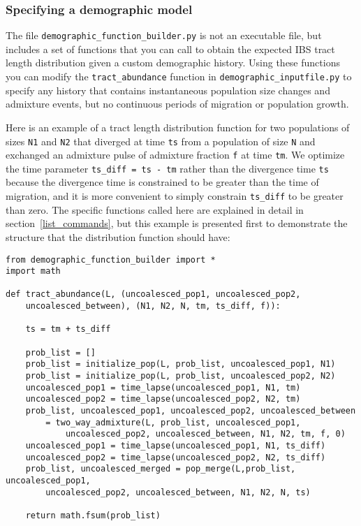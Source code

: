 \documentclass[12pt]{article}
\begin{document}
\subsubsection{Specifying a demographic model}\label{custom_model}

The file \verb|demographic_function_builder.py| is not an executable file, but includes a set of functions that you can call to obtain the expected IBS tract length distribution given a custom demographic history. Using these functions you can modify the \verb|tract_abundance| function in \verb|demographic_inputfile.py| to specify any history that contains instantaneous population size changes and admixture events, but no continuous periods of migration or population growth. 

Here is an example of a tract length distribution function for two populations of sizes \verb|N1| and \verb|N2| that diverged at time \verb|ts| from a population of size \verb|N| and exchanged an admixture pulse of admixture fraction \verb|f| at time \verb|tm|. We optimize the time parameter \verb|ts_diff = ts - tm| rather than the divergence time \verb|ts| because the divergence time is constrained to be greater than the time of migration, and it is more convenient to simply constrain \verb|ts_diff| to be greater than zero. The specific functions called here are explained in detail in section~\ref{list_commands}, but this example is presented first to demonstrate the structure that the distribution function should have:

\begin{Verbatim}
from demographic_function_builder import *
import math

def tract_abundance(L, (uncoalesced_pop1, uncoalesced_pop2, 
	uncoalesced_between), (N1, N2, N, tm, ts_diff, f)):
	
	ts = tm + ts_diff
	
	prob_list = []
	prob_list = initialize_pop(L, prob_list, uncoalesced_pop1, N1)
	prob_list = initialize_pop(L, prob_list, uncoalesced_pop2, N2)
	uncoalesced_pop1 = time_lapse(uncoalesced_pop1, N1, tm)
	uncoalesced_pop2 = time_lapse(uncoalesced_pop2, N2, tm)
	prob_list, uncoalesced_pop1, uncoalesced_pop2, uncoalesced_between 
		= two_way_admixture(L, prob_list, uncoalesced_pop1, 
			uncoalesced_pop2, uncoalesced_between, N1, N2, tm, f, 0)
	uncoalesced_pop1 = time_lapse(uncoalesced_pop1, N1, ts_diff)
	uncoalesced_pop2 = time_lapse(uncoalesced_pop2, N2, ts_diff)
	prob_list, uncoalesced_merged = pop_merge(L,prob_list, uncoalesced_pop1,	
		uncoalesced_pop2, uncoalesced_between, N1, N2, N, ts)
	
	return math.fsum(prob_list)

\end{Verbatim}
\end{document}
